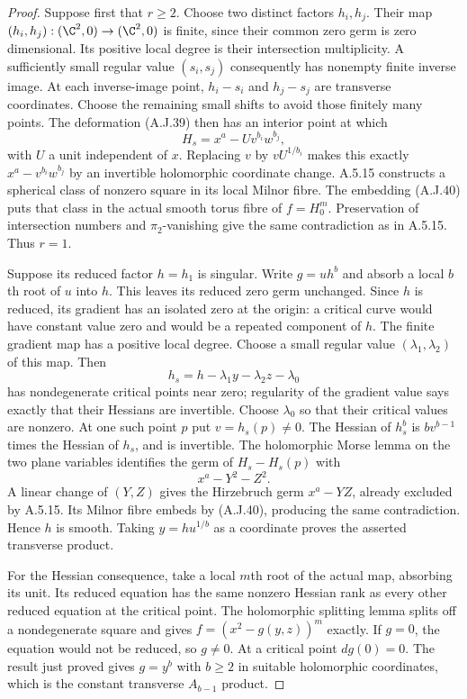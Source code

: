 \begin{proof}
Suppose first that $r\ge2$. Choose two distinct
factors $h_i,h_j$. Their map
$(h_i,h_j):(\C^2,0)\to(\C^2,0)$ is finite,
since their common zero germ is zero dimensional.
Its positive local degree is their intersection
multiplicity. A sufficiently small regular value
$(s_i,s_j)$ consequently has nonempty finite
inverse image. At each inverse-image point,
$h_i-s_i$ and $h_j-s_j$ are transverse coordinates.
Choose the remaining small shifts to avoid those
finitely many points. The deformation (A.J.39)
then has an interior point at which
\[
            H_s=x^a-U v^{b_i}w^{b_j},
\]
with $U$ a unit independent of $x$. Replacing
$v$ by $vU^{1/b_i}$ makes this exactly
$x^a-v^{b_i}w^{b_j}$ by an invertible holomorphic
coordinate change. A.5.15 constructs a spherical
class of nonzero square in its local Milnor fibre.
The embedding (A.J.40) puts that class in the
actual smooth torus fibre of $f=H_0^m$.
Preservation of intersection
numbers and $\pi_2$-vanishing give the same
contradiction as in A.5.15. Thus $r=1$.

Suppose its reduced factor $h=h_1$ is singular.
Write $g=u h^b$ and absorb a local $b$th root of
$u$ into $h$. This leaves its reduced zero germ
unchanged. Since $h$ is reduced, its gradient
has an isolated zero at the origin: a critical
curve would have constant value zero and would
be a repeated component of $h$. The finite
gradient map has a positive local degree.
Choose a small regular value
$(\lambda_1,\lambda_2)$ of this map. Then
\[
        h_s=h-\lambda_1y-\lambda_2z-\lambda_0
\]
has nondegenerate critical points near zero;
regularity of the gradient value says exactly
that their Hessians are invertible. Choose
$\lambda_0$ so that their critical values are
nonzero. At one such point $p$ put
$v=h_s(p)\ne0$. The Hessian of $h_s^b$ is
$b v^{b-1}$ times the Hessian of $h_s$, and
is invertible. The holomorphic Morse lemma on
the two plane variables identifies the germ of
$H_s-H_s(p)$ with
\[
                         x^a-Y^2-Z^2.
\]
A linear change of $(Y,Z)$ gives the Hirzebruch
germ $x^a-YZ$, already excluded by A.5.15.
Its Milnor fibre embeds by (A.J.40), producing
the same contradiction. Hence $h$ is smooth.
Taking $y=h u^{1/b}$ as a coordinate proves the
asserted transverse product.

For the Hessian consequence, take a local $m$th
root of the actual map, absorbing its unit.
Its reduced equation has the same nonzero
Hessian rank as every other reduced equation
at the critical point. The holomorphic splitting
lemma splits off a nondegenerate square and
gives $f=(x^2-g(y,z))^m$ exactly. If $g=0$,
the equation would not be reduced, so $g\ne0$.
At a critical point $dg(0)=0$. The result just
proved gives $g=y^b$ with $b\ge2$ in suitable
holomorphic coordinates, which is the constant
transverse $A_{b-1}$ product.
\end{proof}
